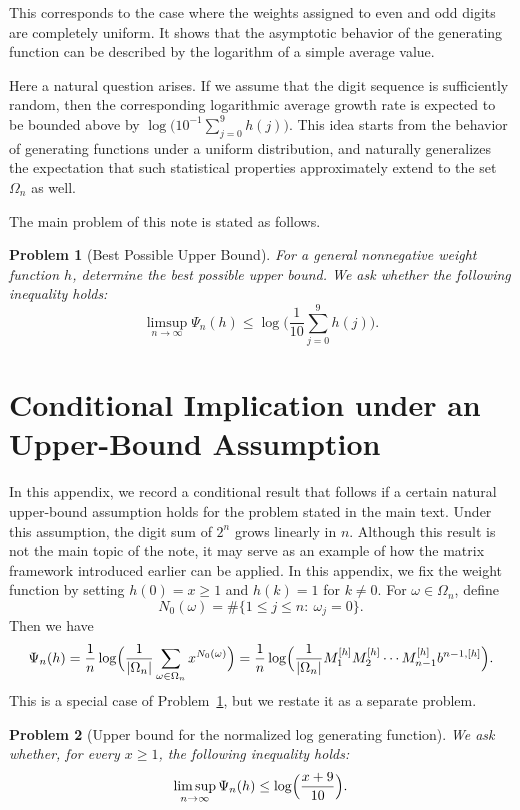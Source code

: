 \documentclass[11pt,a4paper]{article}
\newtheorem{problem}{Problem}
\theoremstyle{plain}
\begin{document}
This corresponds to the case where the weights assigned to even and odd digits are completely uniform.  
It shows that the asymptotic behavior of the generating function can be described by the logarithm of a simple average value.

Here a natural question arises.  
If we assume that the digit sequence is sufficiently random,  
then the corresponding logarithmic average growth rate is expected to be bounded above by $\log \big(10^{-1}\sum_{j=0}^{9}h(j)\big)$.
This idea starts from the behavior of generating functions under a uniform distribution,  
and naturally generalizes the expectation that such statistical properties approximately extend to the set $\Omega_n$ as well.

The main problem of this note is stated as follows.

\begin{problem}[Best Possible Upper Bound]\label{prob:general}
For a general nonnegative weight function $h$, determine the best possible upper bound.  
We ask whether the following inequality holds:
\[
\limsup_{n\to\infty}\Psi_n(h)
\le
\log \Big(\frac{1}{10}\sum_{j=0}^{9}h(j)\Big).
\]
\end{problem}




\appendix
\section{Conditional Implication under an Upper-Bound Assumption}\label{sec:appendix-linear}

In this appendix, we record a conditional result that follows if a certain natural upper-bound assumption holds for the problem stated in the main text.  
Under this assumption, the digit sum of $2^n$ grows linearly in $n$.  
Although this result is not the main topic of the note, it may serve as an example of how the matrix framework introduced earlier can be applied.
In this appendix,
we fix the weight function by setting \(h(0)=x\ge 1\) and \(h(k)=1\) for \(k\neq 0\). For $\omega\in\Omega_n$, define
\[
N_0(\omega)=\#\{1\le j\le n:\ \omega_j=0\}.
\]
Then we have
\[
\Psi_n(h)
= \frac{1}{n}\log\Bigl(\frac{1}{|\Omega_n|}
\sum_{\omega\in\Omega_n} x^{N_0(\omega)} \Bigr)
= \frac{1}{n}\log\Bigl(\frac{1}{|\Omega_n|} M_1^{[h]}   M_2^{[h]} \cdots M_{n-1}^{[h]}   b^{n-1,[h]} \Bigr).
\]
This is a special case of Problem~\ref{prob:general}, but we restate it as a separate problem.

\begin{problem}[Upper bound for the normalized log generating function]\label{prob:mgf}
We ask whether, for every $x \ge 1$, the following inequality holds:
\begin{equation}\label{eq:premise-limsup}
\limsup_{n\to\infty} \Psi_n(h)
\le \log\Bigl(\frac{x+9}{10}\Bigr).
\end{equation}
\end{problem}
\end{document}

